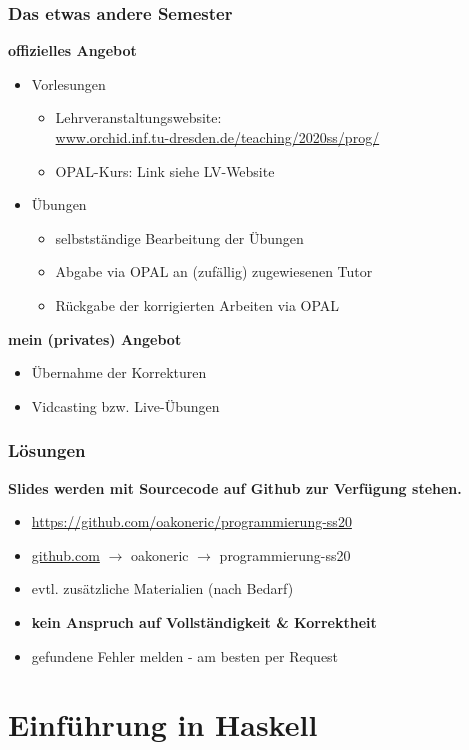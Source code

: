 \documentclass{beamer}
\begin{document}
	\begin{frame} \frametitle{Das etwas andere Semester}
		\footnotesize
		\textbf{offizielles Angebot}
		\begin{itemize}
			\item Vorlesungen
			\begin{itemize}
				\item Lehrveranstaltungswebsite: \\ \url{www.orchid.inf.tu-dresden.de/teaching/2020ss/prog/}
				\item OPAL-Kurs: Link siehe LV-Website
			\end{itemize}
			\item Übungen
			\begin{itemize}
				\item selbstständige Bearbeitung der Übungen
				\item Abgabe via OPAL an (zufällig) zugewiesenen Tutor
				\item Rückgabe der korrigierten Arbeiten via OPAL
			\end{itemize} 
		\end{itemize}
		\textbf{mein (privates) Angebot}
		\begin{itemize}
			\item Übernahme der Korrekturen
			\item Vidcasting bzw. Live-Übungen
		\end{itemize}
	\end{frame}


	\begin{frame} \frametitle{Lösungen}
		\textbf{Slides werden mit Sourcecode auf Github zur Verfügung stehen.}
		\begin{itemize}[leftmargin=*]
			\item \url{https://github.com/oakoneric/programmierung-ss20}
			\item \url{github.com} $\to$ oakoneric $\to$ programmierung-ss20
			\item evtl. zusätzliche Materialien (nach Bedarf)
			\item \alert{\textbf{kein Anspruch auf Vollständigkeit \& Korrektheit}}
			\item gefundene Fehler melden - am besten per Request
		\end{itemize}
	\end{frame}


\section{Einführung in Haskell}
\end{document}
